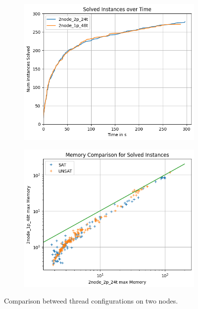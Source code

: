 \documentclass[12pt,a4paper,twoside]{scrartcl}
\numberwithin{equation}{section}
\begin{document}
\begin{figure}
  \center
  \begin{subfigure}[c]{0.4\textwidth}
    \center
    \includegraphics[scale=0.5]{plots/config_compare/2node_config_compare.png}
    \caption{}
    \label{2nodeConfigRuntimeCompare}
  \end{subfigure}
  \hfill
  \begin{subfigure}[c]{0.4\textwidth}
    \center
    \includegraphics[scale=0.5]{plots/config_compare/2node_config_mem_compare.png}
    \caption{}
    \label{fig:2nodeConfigMemCompare}
  \end{subfigure}
  \caption{Comparison betweed thread configurations on two nodes.}
  \label{fig:2nodeConfigCompare}
\end{figure}
\end{document}
